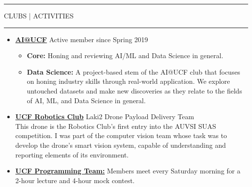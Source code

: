 \documentclass{article}
\newcommand{\makesection}[1]{\hrule\vskip1mm\uppercase{#1}\vskip1mm\hrule}
\begin{document}
\makesection{Clubs | Activities}
\begin{itemize}[leftmargin=.35cm]

    \item \textbf{\href{https://ucfai.org}{AI@UCF}} Active member since Spring 2019
    \vspace*{-1.5mm}
    \begin{itemize}[$\circ$]
        \item \textbf{Core:} Honing and reviewing AI/ML and Data Science in general.
        \item \textbf{Data Science:} A project-based stem of the AI@UCF club that focuses on honing industry skills through real-world application. We explore untouched datasets and make new discoveries as they relate to the fields of AI, ML, and Data Science in general.
    \end{itemize}

    \item \textbf{\href{https://robotics.ucf.edu/projects/2019}{UCF Robotics Club}} Laki2 Drone Payload Delivery Team \\
    This drone is the Robotics Club's first entry into the AUVSI SUAS competition. I was part of the computer vision team whose task was to develop the drone's smart vision system, capable of understanding and reporting elements of its environment.

    \item \textbf{\href{https://www.ucfprogrammingteam.org}{UCF Programming Team:}} Members meet every Saturday morning for a 2-hour lecture and 4-hour mock contest.
\end{itemize}
\end{document}
